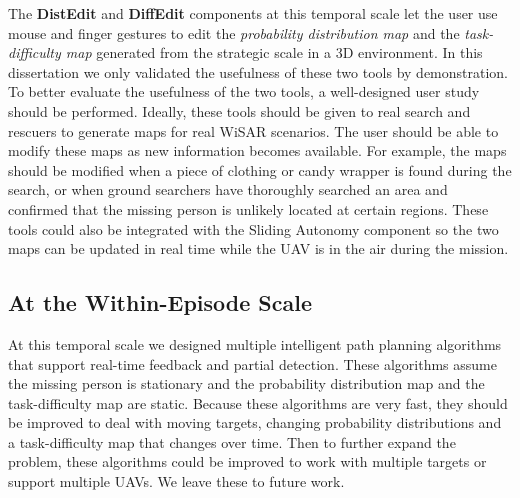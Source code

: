 The \textbf{DistEdit} and \textbf{DiffEdit} components at this temporal scale let the user use mouse and finger gestures to edit the \textit{probability distribution map} and the \textit{task-difficulty map} generated from the strategic scale in a 3D environment. In this dissertation we only validated the usefulness of these two tools by demonstration. To better evaluate the usefulness of the two tools, a well-designed user study should be performed. Ideally, these tools should be given to real search and rescuers to generate maps for real WiSAR scenarios. The user should be able to modify these maps as new information becomes available. For example, the maps should be modified when a piece of clothing or candy wrapper is found during the search, or when ground searchers have thoroughly searched an area and confirmed that the missing person is unlikely located at certain regions. These tools could also be integrated with the Sliding Autonomy component so the two maps can be updated in real time while the UAV is in the air during the mission.

\subsection{At the Within-Episode Scale}

At this temporal scale we designed multiple intelligent path planning algorithms that support real-time feedback and partial detection. These algorithms assume the missing person is stationary and the probability distribution map and the task-difficulty map are static. Because these algorithms are very fast, they should be improved to deal with moving targets, changing probability distributions and a task-difficulty map that changes over time. Then to further expand the problem, these algorithms could be improved to work with multiple targets or support multiple UAVs. We leave these to future work.

